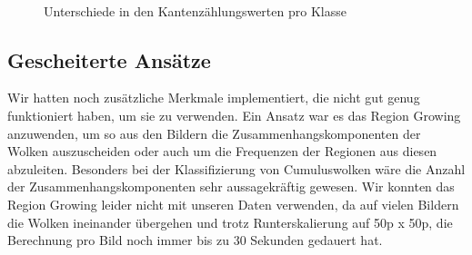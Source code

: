 \documentclass[a4,german]{article}
\begin{document}
\begin{figure}[h!]
\centering
{} \\
\caption{Unterschiede in den Kantenzählungswerten pro Klasse}
    \label{fig:kbs}
\end{figure}



\subsection{Gescheiterte Ansätze}
Wir hatten noch zusätzliche Merkmale implementiert, die nicht gut genug funktioniert haben, um sie zu verwenden.
Ein Ansatz war es das Region Growing anzuwenden, um so aus den Bildern die Zusammenhangskomponenten der Wolken auszuscheiden oder auch um die Frequenzen der Regionen aus diesen abzuleiten.
Besonders bei der Klassifizierung von Cumuluswolken
wäre die Anzahl der Zusammenhangskomponenten sehr aussagekräftig gewesen.
Wir konnten das Region Growing leider nicht mit unseren Daten verwenden, da auf vielen Bildern die Wolken ineinander übergehen und trotz Runterskalierung auf 50p x 50p, die Berechnung pro Bild noch immer bis zu 30 Sekunden gedauert hat.
\end{document}
